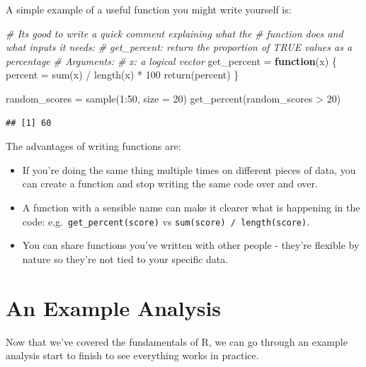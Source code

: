 \documentclass[
]{book}
\newenvironment{Shaded}{\begin{snugshade}}{\end{snugshade}}
\newcommand{\AttributeTok}[1]{\textcolor[rgb]{0.77,0.63,0.00}{#1}}
\newcommand{\CommentTok}[1]{\textcolor[rgb]{0.56,0.35,0.01}{\textit{#1}}}
\newcommand{\ControlFlowTok}[1]{\textcolor[rgb]{0.13,0.29,0.53}{\textbf{#1}}}
\newcommand{\DecValTok}[1]{\textcolor[rgb]{0.00,0.00,0.81}{#1}}
\newcommand{\FunctionTok}[1]{\textcolor[rgb]{0.00,0.00,0.00}{#1}}
\newcommand{\NormalTok}[1]{#1}
\newcommand{\OtherTok}[1]{\textcolor[rgb]{0.56,0.35,0.01}{#1}}
\newcommand{\SpecialCharTok}[1]{\textcolor[rgb]{0.00,0.00,0.00}{#1}}
\providecommand{\tightlist}{%
  \setlength{\itemsep}{0pt}\setlength{\parskip}{0pt}}
\begin{document}
A simple example of a useful function you might write yourself is:

\begin{Shaded}
\begin{Highlighting}[]
\CommentTok{\# It\textquotesingle{}s good to write a quick comment explaining what the}
\CommentTok{\#   function does and what inputs it needs:}
\CommentTok{\# get\_percent: return the proportion of TRUE values as a percentage}
\CommentTok{\# Arguments:}
\CommentTok{\# x: a logical vector}
\NormalTok{get\_percent }\OtherTok{=} \ControlFlowTok{function}\NormalTok{(x) \{}
\NormalTok{   percent }\OtherTok{=} \FunctionTok{sum}\NormalTok{(x) }\SpecialCharTok{/} \FunctionTok{length}\NormalTok{(x) }\SpecialCharTok{*} \DecValTok{100} 
   \FunctionTok{return}\NormalTok{(percent)}
\NormalTok{\}}

\NormalTok{random\_scores }\OtherTok{=} \FunctionTok{sample}\NormalTok{(}\DecValTok{1}\SpecialCharTok{:}\DecValTok{50}\NormalTok{, }\AttributeTok{size =} \DecValTok{20}\NormalTok{)}
\FunctionTok{get\_percent}\NormalTok{(random\_scores }\SpecialCharTok{\textgreater{}} \DecValTok{20}\NormalTok{)}
\end{Highlighting}
\end{Shaded}

\begin{verbatim}
## [1] 60
\end{verbatim}

The advantages of writing functions are:

\begin{itemize}
\tightlist
\item
  If you're doing the same thing multiple times on different pieces of data,
  you can create a function and stop writing the same code over and over.
\item
  A function with a sensible name can make it clearer what is happening
  in the code: e.g.~\texttt{get\_percent(score)} vs \texttt{sum(score)\ /\ length(score)}.
\item
  You can share functions you've written with other people - they're
  flexible by nature so they're not tied to your specific data.
\end{itemize}

\hypertarget{an-example-analysis}{%
\chapter{An Example Analysis}\label{an-example-analysis}}

Now that we've covered the fundamentals of R, we can go through
an example analysis start to finish to see everything works in practice.
\end{document}
